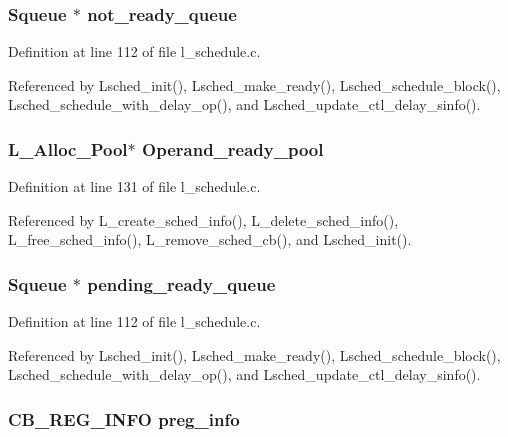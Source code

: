 \subsubsection{\setlength{\rightskip}{0pt plus 5cm}\bf{Squeue} $\ast$ \bf{not\_\-ready\_\-queue}}\label{l__schedule_8h_fe3f0aa3f7900d8acb68f9c302f32a7f}




Definition at line 112 of file l\_\-schedule.c.

Referenced by Lsched\_\-init(), Lsched\_\-make\_\-ready(), Lsched\_\-schedule\_\-block(), Lsched\_\-schedule\_\-with\_\-delay\_\-op(), and Lsched\_\-update\_\-ctl\_\-delay\_\-sinfo().
\subsubsection{\setlength{\rightskip}{0pt plus 5cm}\bf{L\_\-Alloc\_\-Pool}$\ast$ \bf{Operand\_\-ready\_\-pool}}\label{l__schedule_8h_5aeea507b43d25bfcbdd09f85aa420ca}




Definition at line 131 of file l\_\-schedule.c.

Referenced by L\_\-create\_\-sched\_\-info(), L\_\-delete\_\-sched\_\-info(), L\_\-free\_\-sched\_\-info(), L\_\-remove\_\-sched\_\-cb(), and Lsched\_\-init().
\subsubsection{\setlength{\rightskip}{0pt plus 5cm}\bf{Squeue} $\ast$ \bf{pending\_\-ready\_\-queue}}\label{l__schedule_8h_065691cd75db4683c71bba868f90264d}




Definition at line 112 of file l\_\-schedule.c.

Referenced by Lsched\_\-init(), Lsched\_\-make\_\-ready(), Lsched\_\-schedule\_\-block(), Lsched\_\-schedule\_\-with\_\-delay\_\-op(), and Lsched\_\-update\_\-ctl\_\-delay\_\-sinfo().
\subsubsection{\setlength{\rightskip}{0pt plus 5cm}\bf{CB\_\-REG\_\-INFO} \bf{preg\_\-info}}\label{l__schedule_8h_0647b4f1b08b4ccefd9a78e4a6ab1b54}




